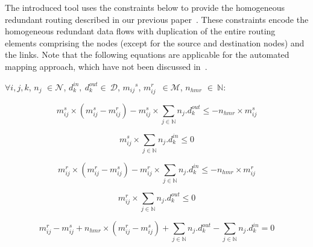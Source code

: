     The introduced tool uses the constraints below to provide the homogeneous redundant routing described in our previous paper~\cite{9565115}. These constraints encode the homogeneous redundant data flows with duplication of the entire routing elements comprising the nodes (except for the source and destination nodes) and the links. 
     Note that the following equations are applicable for the automated mapping approach, which have not been discussed in~\cite{9565115}.\newline




 $\forall i, j, k$, ${n_{j}}$  $\in \mathcal{N}$, $d_k^{in},~d_k^{out}\in~\mathcal{D}$, ${m_{ij}}^{s}$, $m_{ij}^{r}$~$\in\mathcal{M}$, $n_{hmr}$ $\in~\mathbb{N}$:\newline

	\begin{equation}
		 {m_{ij}^{s}} \times ({m_{ij}^{s}} - m_{ij}^{r}) - {m_{ij}^{s}} \times \sum_{j \in \mathbb{N} } n_{j}.d_{k}^{out} \leq - n_{hmr} \times {m_{ij}^{s}}
		\label{eqh1} 
	\end{equation}
	
	\begin{equation}%
		 {m_{ij}^{s}} \times \sum_{j \in \mathbb{N} } n_{j}.d_{k}^{in} \leq 0 
		\label{eqh2}
	\end{equation}
	
	\begin{equation}%
		{m_{ij}^{r}} \times ({m_{ij}^{r}} - m_{ij}^{s})  - {m_{ij}^{r}} \times \sum_{j \in \mathbb{N} } n_{j}.d_{k}^{in} \leq - n_{hmr} \times {m_{ij}^{r}}
		\label{eqh3}
	\end{equation}

	\begin{equation}%
		 {m_{ij}^{r}} \times \sum_{j \in \mathbb{N} } n_{j}.d_{k}^{out} \leq 0 
		\label{eqh4}
	\end{equation}
	



    \begin{equation}	
     m_{ij}^{r} - m_{ij}^{s} +  n_{hmr} \times (m_{ij}^{r} - {m_{ij}^{s}})  + \sum_{j \in \mathbb{N} } n_{j}.d_k^{out} - \sum_{j \in \mathbb{N} } n_{j}.d_k^{in}  = 0
    	\label{eqh5}
    \end{equation}

